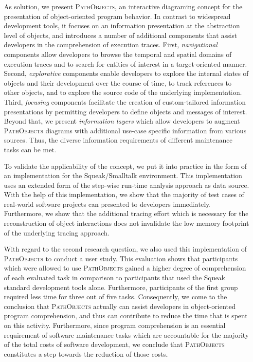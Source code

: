 As solution, we present \textsc{PathObjects}, an interactive diagraming concept for the presentation of object-oriented program behavior.
In contrast to widespread development tools, it focuses on an information presentation at the abstraction level of objects, and introduces a number of additional components that assist developers in the comprehension of execution traces.
First, \textit{navigational} components allow developers to browse the temporal and spatial domains of execution traces and to search for entities of interest in a target-oriented manner.
Second, \textit{explorative} components enable developers to explore the internal states of objects and their development over the course of time, to track references to other objects, and to explore the source code of the underlying implementation.
Third, \textit{focusing} components facilitate the creation of custom-tailored information presentations by permitting developers to define objects and messages of interest.
Beyond that, we present \textit{information layers} which allow developers to augment \textsc{PathObjects} diagrams with additional use-case specific information from various sources.
Thus, the diverse information requirements of different maintenance tasks can be met.

To validate the applicability of the concept, we put it into practice in the form of an implementation for the Squeak/Smalltalk environment.
This implementation uses an extended form of the step-wise run-time analysis approach as data source.
With the help of this implementation, we show that the majority of test cases of real-world software projects can presented to developers immediately.
Furthermore, we show that the additional tracing effort which is necessary for the reconstruction of object interactions does not invalidate the low memory footprint of the underlying tracing approach.

With regard to the second research question, we also used this implementation of \textsc{PathObjects} to conduct a user study.
This evaluation shows that participants which were allowed to use \textsc{PathObjects} gained a higher degree of comprehension of each evaluated task in comparison to participants that used the Squeak standard development tools alone.
Furthermore, participants of the first group required less time for three out of five tasks.
Consequently, we come to the conclusion that \textsc{PathObjects} actually can assist developers in object-oriented program comprehension, and thus can contribute to reduce the time that is spent on this activity.
Furthermore, since program comprehension is an essential requirement of software maintenance tasks which are accountable for the majority of the total costs of software development, we conclude that \textsc{PathObjects} constitutes a step towards the reduction of those costs.

